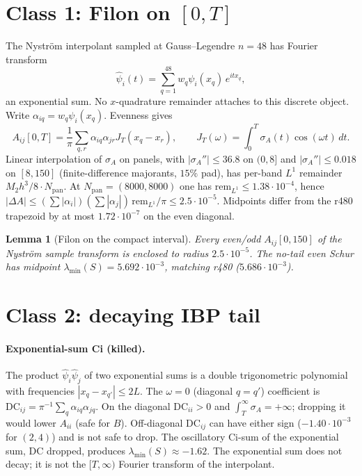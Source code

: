 \documentclass[11pt]{article}
\newtheorem{lemma}{Lemma}
\theoremstyle{remark}
\begin{document}
\section{Class 1: Filon on $[0,T]$}

The Nystr\"om interpolant sampled at Gauss--Legendre
$n=48$ has Fourier transform
\[
 \hat\psi_i(t)=\sum_{q=1}^{48} w_q\psi_i(x_q)\,e^{itx_q},
\]
an exponential sum.  No $x$-quadrature remainder attaches
to this discrete object.
Write $\alpha_{iq}=w_q\psi_i(x_q)$.  Evenness gives
\[
 A_{ij}[0,T]=\frac1\pi\sum_{q,r}\alpha_{iq}\alpha_{jr}
 J_T(x_q-x_r),\qquad
 J_T(\omega)=\int_0^T\sigma_A(t)\cos(\omega t)\,dt.
\]
Linear interpolation of $\sigma_A$ on panels, with
$|\sigma_A''|\le36.8$ on $(0,8]$ and $|\sigma_A''|\le0.018$
on $[8,150]$ (finite-difference majorants, $15\%$ pad),
has per-band $L^1$ remainder $M_2 h^3/8\cdot N_{\mathrm{pan}}$.
At $N_{\mathrm{pan}}=(8000,8000)$ one has
$\mathrm{rem}_{L^1}\le1.38\cdot10^{-4}$, hence
$|\Delta A|\le(\sum|\alpha_i|)(\sum|\alpha_j|)\,\mathrm{rem}_{L^1}/\pi
\le2.5\cdot10^{-5}$.
Midpoints differ from the r480 trapezoid by
at most $1.72\cdot10^{-7}$ on the even diagonal.

\begin{lemma}[{Filon on the compact interval}]
Every even/odd $A_{ij}[0,150]$ of the Nystr\"om sample
transform is enclosed to radius $2.5\cdot10^{-5}$.
The no-tail even Schur has midpoint
$\lambda_{\min}(S)=5.692\cdot10^{-3}$, matching r480
($5.686\cdot10^{-3}$).
\end{lemma}

\section{Class 2: decaying IBP tail}

\paragraph{Exponential-sum Ci (killed).}
The product $\hat\psi_i\hat\psi_j$ of two exponential
sums is a double trigonometric polynomial with frequencies
$|x_q-x_{q'}|\le2L$.
The $\omega=0$ (diagonal $q=q'$) coefficient is
$\mathrm{DC}_{ij}=\pi^{-1}\sum_q\alpha_{iq}\alpha_{jq}$.
On the diagonal $\mathrm{DC}_{ii}>0$ and
$\int_T^\infty\sigma_A=+\infty$; dropping it would lower
$A_{ii}$ (safe for $B$).
Off-diagonal $\mathrm{DC}_{ij}$ can have either sign
($-1.40\cdot10^{-3}$ for $(2,4)$) and is not safe to drop.
The oscillatory Ci-sum of the exponential sum, DC dropped,
produces $\lambda_{\min}(S)\approx-1.62$.
The exponential sum does not decay; it is not the
$[T,\infty)$ Fourier transform of the interpolant.
\end{document}
